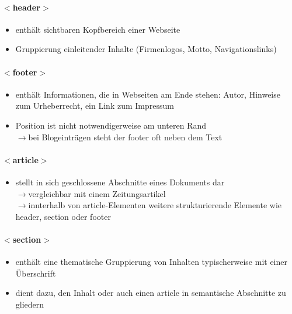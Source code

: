 \paragraph{$<$header$>$}
\begin{itemize}[noitemsep,topsep=0pt,leftmargin=*]
    \item enthält sichtbaren Kopfbereich einer Webseite
    \item Gruppierung einleitender Inhalte (Firmenlogos, Motto, Navigationslinks)
\end{itemize}

\paragraph{$<$footer$>$}
\begin{itemize}[noitemsep,topsep=0pt,leftmargin=*]
    \item enthält Informationen, die in Webseiten am Ende stehen: Autor, Hinweise zum Urheberrecht, ein Link zum Impressum
    \item Position ist nicht notwendigerweise am unteren Rand\\
    $\rightarrow$bei Blogeinträgen steht der footer oft neben dem Text
\end{itemize}

\paragraph{$<$article$>$}
\begin{itemize}[noitemsep,topsep=0pt,leftmargin=*]
    \item stellt in sich geschlossene Abschnitte eines Dokuments dar\\
    $\rightarrow$vergleichbar mit einem Zeitungsartikel\\
    $\rightarrow$innterhalb von article-Elementen weitere strukturierende Elemente wie header, section oder footer
\end{itemize}

\paragraph{$<$section$>$}
\begin{itemize}[noitemsep,topsep=0pt,leftmargin=*]
    \item enthält eine thematische Gruppierung von Inhalten typischerweise mit einer Überschrift
    \item dient dazu, den Inhalt oder auch einen article in semantische Abschnitte zu gliedern
\end{itemize}


